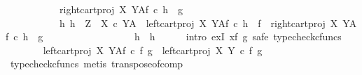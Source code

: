 \begin{isabellebody}
\ \ \ \ \ \ \ \ \ \ \ right{\isacharunderscore}{\kern0pt}cart{\isacharunderscore}{\kern0pt}proj\ X\ Y\isactrlbsup A\isactrlesup \isactrlsub f\ {\isasymcirc}\isactrlsub c\ h\ {\isacharequal}{\kern0pt}\ g\ {\isasymand}\isanewline
\ \ \ \ \ \ \ \ \ \ \ {\isacharparenleft}{\kern0pt}{\isasymforall}h{}{\isachardot}{\kern0pt}\ h{}\ {\isacharcolon}{\kern0pt}\ Z\ {\isasymrightarrow}\ {\isacharparenleft}{\kern0pt}X\ {\isasymtimes}\isactrlsub c\ Y{\isacharparenright}{\kern0pt}\isactrlbsup A\isactrlesup \ {\isasymand}\ left{\isacharunderscore}{\kern0pt}cart{\isacharunderscore}{\kern0pt}proj\ X\ Y\isactrlbsup A\isactrlesup \isactrlsub f\ {\isasymcirc}\isactrlsub c\ h{}\ {\isacharequal}{\kern0pt}\ f\ {\isasymand}\ right{\isacharunderscore}{\kern0pt}cart{\isacharunderscore}{\kern0pt}proj\ X\ Y\isactrlbsup A\isactrlesup \isactrlsub f\ {\isasymcirc}\isactrlsub c\ h{}\ {\isacharequal}{\kern0pt}\ g\ {\isasymlongrightarrow}\isanewline
\ \ \ \ \ \ \ \ \ \ \ \ \ \ \ \ \ h{}\ {\isacharequal}{\kern0pt}\ h{\isacharparenright}{\kern0pt}{\isachardoublequoteclose}\isanewline
\ \ \ \ \isamarkupfalse%
\ {\isacharparenleft}{\kern0pt}intro\ exI{\isacharbrackleft}{\kern0pt}\ x{\isacharequal}{\kern0pt}{\isachardoublequoteopen}{\isasymlangle}f\isactrlsup {\isasymflat}\ {\isacharcomma}{\kern0pt}g\isactrlsup {\isasymflat}{\isasymrangle}\isactrlsup {\isasymsharp}{\isachardoublequoteclose}{\isacharbrackright}{\kern0pt}{\isacharcomma}{\kern0pt}\ safe{\isacharcomma}{\kern0pt}\ typecheck{\isacharunderscore}{\kern0pt}cfuncs{\isacharparenright}{\kern0pt}\isanewline
\ \ \ \ \ \ \isamarkupfalse%
\ {\isachardoublequoteopen}{\isacharparenleft}{\kern0pt}{\isacharparenleft}{\kern0pt}left{\isacharunderscore}{\kern0pt}cart{\isacharunderscore}{\kern0pt}proj\ X\ Y{\isacharparenright}{\kern0pt}\isactrlbsup A\isactrlesup \isactrlsub f{\isacharparenright}{\kern0pt}\ {\isasymcirc}\isactrlsub c\ {\isasymlangle}f\isactrlsup {\isasymflat}\ {\isacharcomma}{\kern0pt}g\isactrlsup {\isasymflat}{\isasymrangle}\isactrlsup {\isasymsharp}\ {\isacharequal}{\kern0pt}\ {\isacharparenleft}{\kern0pt}{\isacharparenleft}{\kern0pt}left{\isacharunderscore}{\kern0pt}cart{\isacharunderscore}{\kern0pt}proj\ X\ Y{\isacharparenright}{\kern0pt}\ {\isasymcirc}\isactrlsub c\ {\isasymlangle}f\isactrlsup {\isasymflat}\ {\isacharcomma}{\kern0pt}g\isactrlsup {\isasymflat}{\isasymrangle}{\isacharparenright}{\kern0pt}\isactrlsup {\isasymsharp}{\isachardoublequoteclose}\isanewline
\ \ \ \ \ \ \ \ \isamarkupfalse%
\ {\isacharparenleft}{\kern0pt}typecheck{\isacharunderscore}{\kern0pt}cfuncs{\isacharcomma}{\kern0pt}\ metis\ transpose{\isacharunderscore}{\kern0pt}of{\isacharunderscore}{\kern0pt}comp{\isacharparenright}{\kern0pt}\isanewline

\end{isabellebody}
